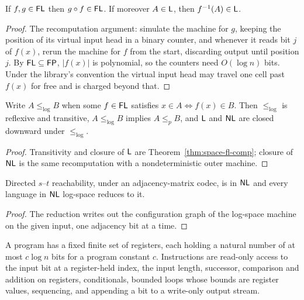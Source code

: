 \begin{theorem}
  \label{thm:space-fl-comp}
  If $f, g \in \mathsf{FL}$ then $g \circ f \in \mathsf{FL}$. If moreover
  $A \in \mathsf{L}$, then $f^{-1}(A) \in \mathsf{L}$.
\end{theorem}
\begin{proof}
  The recomputation argument: simulate the machine for $g$, keeping the
  position of its virtual input head in a binary counter, and whenever it reads
  bit $j$ of $f(x)$, rerun the machine for $f$ from the start, discarding output
  until position $j$. By $\mathsf{FL} \subseteq \mathsf{FP}$, $|f(x)|$ is polynomial, so
  the counters need $O(\log n)$ bits. Under the library's convention the
  virtual input head may travel one cell past $f(x)$ for free and is charged
  beyond that.
\end{proof}

\begin{proposition}
  \label{prop:space-logspace-reductions}
  Write $A \le_{\log} B$ when some $f \in \mathsf{FL}$ satisfies
  $x \in A \iff f(x) \in B$. Then $\le_{\log}$ is reflexive and transitive,
  $A \le_{\log} B$ implies $A \le_p B$, and $\mathsf{L}$ and $\mathsf{NL}$ are closed
  downward under $\le_{\log}$.
\end{proposition}
\begin{proof}
  Transitivity and closure of $\mathsf{L}$ are Theorem~\ref{thm:space-fl-comp};
  closure of $\mathsf{NL}$ is the same recomputation with a nondeterministic outer
  machine.
\end{proof}

\begin{theorem}
  \label{thm:space-path-nl-complete}
  \notready
  Directed $s$--$t$ reachability, under an adjacency-matrix codec, is in
  $\mathsf{NL}$ and every language in $\mathsf{NL}$ log-space reduces to it.
\end{theorem}
\begin{proof}
  The reduction writes out the configuration graph of the log-space machine on
  the given input, one adjacency bit at a time.
\end{proof}

\begin{definition}
  \label{def:space-logspace-programs}
  A program has a fixed finite set of registers, each holding a natural number
  of at most $c \log n$ bits for a program constant $c$. Instructions are
  read-only access to the input bit at a register-held index, the input length,
  successor, comparison and addition on registers, conditionals, bounded loops
  whose bounds are register values, sequencing, and appending a bit to a
  write-only output stream.
\end{definition}

